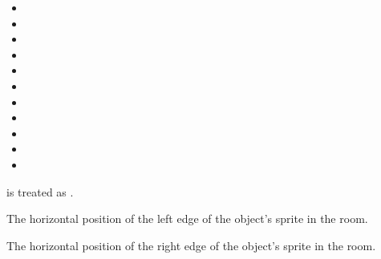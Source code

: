 \documentclass[letterpaper,10pt,english]{sphinxmanual}
\begin{document}
\begin{fulllineitems}
\begin{fulllineitems}
\begin{itemize}
\item {} 

\item {} 

\item {} 

\item {} 

\item {} 

\item {} 

\item {} 

\item {} 

\item {} 

\item {} 

\item {} 

\end{itemize}

 is treated as .

\end{fulllineitems}


\begin{fulllineitems}
\label{dsp:sge.dsp.Object.image_left}
The horizontal position of the left edge of the object's sprite
in the room.

\end{fulllineitems}


\begin{fulllineitems}
\label{dsp:sge.dsp.Object.image_right}
The horizontal position of the right edge of the object's sprite
in the room.

\end{fulllineitems}



\end{fulllineitems}
\end{document}
